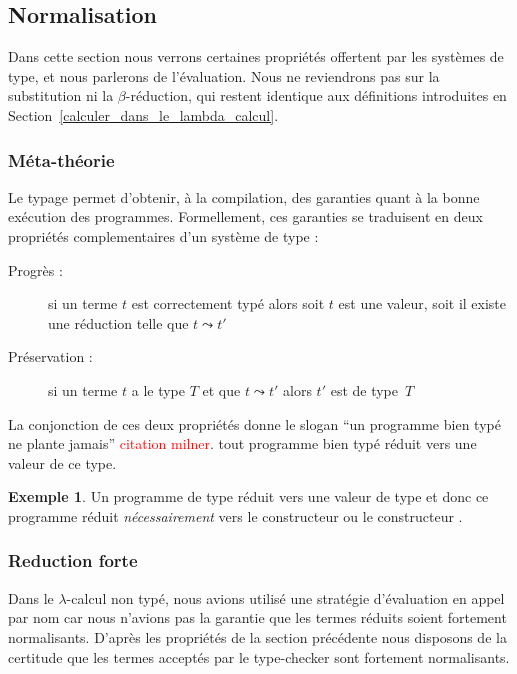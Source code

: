 \documentclass {article}
\theoremstyle{definition}
\newtheorem{example}{Exemple}
\theoremstyle{remark}
\newcommand{\todo}[1]{\textcolor{red}{#1}}
\begin{document}
\subsection{Normalisation} 

Dans cette section nous verrons certaines propriétés offertent par les
systèmes de type, et nous parlerons de l'évaluation. Nous ne
reviendrons pas sur la substitution ni la $\beta$-réduction, qui
restent identique aux définitions introduites en
Section~\ref{calculer_dans_le_lambda_calcul}.

\subsubsection{Méta-théorie}
\label{meta_theorie}

Le typage permet d'obtenir, à la compilation, des garanties quant à la
bonne exécution des programmes.  Formellement, ces garanties se traduisent en deux propriétés complementaires d'un système de type :
\begin{description}
\item[Progrès :] si un terme \(t\) est correctement typé alors soit \(t\) est une valeur, soit il
 existe une réduction telle que \(t \leadsto t'\)
\item[Préservation :] si un terme $t$ a le type $T$
et que $t \leadsto t'$ alors $t'$ est de type~$T$
\end{description}

La conjonction de ces deux propriétés donne le slogan ``un programme
bien typé ne plante jamais'' \todo{citation milner}. tout programme
bien typé réduit vers une valeur de ce type.

\begin{example}
  Un programme de type \bool{} réduit vers une valeur de type \bool{}
  et donc ce programme réduit \emph{nécessairement} vers le
  constructeur \true{} ou le constructeur \false{}.
\end{example}


\subsubsection{Reduction forte}

\label{reduction_forte}
Dans le \(\lambda\)-calcul non typé, nous avions utilisé une stratégie
d'évaluation en appel par nom car nous n'avions pas la garantie que
les termes réduits soient fortement normalisants.  D'après les
propriétés de la section précédente nous disposons de la certitude que
les termes acceptés par le type-checker sont fortement
normalisants.
\end{document}
